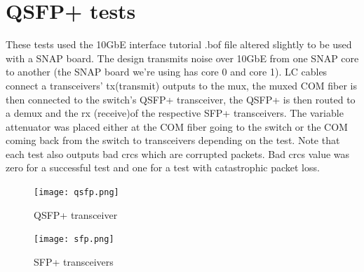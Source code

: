 \documentclass{article}
\begin{document}
\section*{QSFP+ tests}
These tests used the 10GbE interface tutorial .bof file altered slightly to be used with a SNAP board. The design transmits noise over 10GbE from one SNAP core to another (the SNAP board we're using has core 0 and core 1). LC cables connect a transceivers' tx(transmit) outputs to the mux, the muxed COM fiber is then connected to the switch's QSFP+ transceiver, the QSFP+ is then routed to a demux and the rx (receive)of the respective SFP+ transceivers. The variable attenuator was placed either at the COM fiber going to the switch or the COM coming back from the switch to transceivers depending on the test. Note that each test also outputs bad crcs which are corrupted packets. Bad crcs value was zero for a successful test and one for a test with catastrophic packet loss. 
\begin{figure}[h]
\centering
	\begin{minipage}{.4\textwidth}
		\centering
		\texttt{[image: qsfp.png]}
		\caption{QSFP+ transceiver} 
	\end{minipage}
	\begin{minipage}{.4\textwidth}
		\centering
		\texttt{[image: sfp.png]}
		\caption{SFP+ transceivers}
	\end{minipage}
\end{figure}
\end{document}
